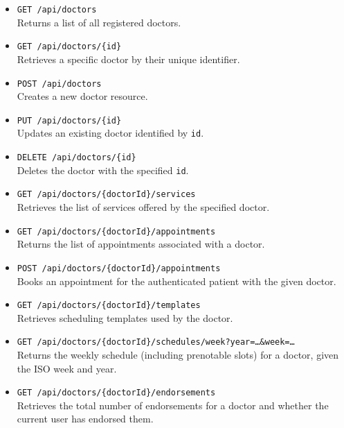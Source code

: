 \begin{itemize}
	\item \texttt{GET /api/doctors} \\
	Returns a list of all registered doctors.
	
	\item \texttt{GET /api/doctors/\{id\}} \\
	Retrieves a specific doctor by their unique identifier.
	
	\item \texttt{POST /api/doctors} \\
	Creates a new doctor resource.
	
	\item \texttt{PUT /api/doctors/\{id\}} \\
	Updates an existing doctor identified by \texttt{id}.
	
	\item \texttt{DELETE /api/doctors/\{id\}} \\
	Deletes the doctor with the specified \texttt{id}.
	
	\item \texttt{GET /api/doctors/\{doctorId\}/services} \\
	Retrieves the list of services offered by the specified doctor.
	
	\item \texttt{GET /api/doctors/\{doctorId\}/appointments} \\
	Returns the list of appointments associated with a doctor.
	
	\item \texttt{POST /api/doctors/\{doctorId\}/appointments} \\
	Books an appointment for the authenticated patient with the given doctor.
	
	\item \texttt{GET /api/doctors/\{doctorId\}/templates} \\
	Retrieves scheduling templates used by the doctor.
	
	\item \texttt{GET /api/doctors/\{doctorId\}/schedules/week?year=\dots\&week=\dots} \\
	Returns the weekly schedule (including prenotable slots) for a doctor, given the ISO week and year.
	
	\item \texttt{GET /api/doctors/\{doctorId\}/endorsements} \\
	Retrieves the total number of endorsements for a doctor and whether the current user has endorsed them.
	

\end{itemize}
